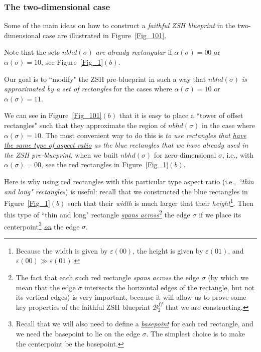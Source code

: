 \documentclass[12pt,letterpaper]{article}
\renewcommand{\S}{\mathcal{S}}
\newcommand{\B}{\mathcal{B}}
\newcommand{\eps}{\varepsilon}
\newcommand{\nbhd}{\mathit{nbhd}}
\begin{document}
\subsubsection{The two-dimensional case}


Some of the main ideas on how  to construct  a {\em faithful ZSH blueprint} in the two-dimensional case are illustrated in Figure~\ref{Fig_101}. 

Note that the sets $\nbhd(\sigma)$ {\em are already rectangular} if $\alpha(\sigma) = 00$ or $\alpha(\sigma) = 10$, see Figure~\ref{Fig_1}$(b)$. 

Our goal is to ``modify" the ZSH pre-blueprint in such a way that $\nbhd(\sigma)$ {\em is approximated by a set of rectangles} for the cases where $\alpha(\sigma) = 10$ or $\alpha(\sigma) = 11$. 

We can see in Figure~\ref{Fig_101}$(b)$ that it is easy to place a ``tower of offset rectangles" such that they  approximate the region of $\nbhd(\sigma)$ in the case where $\alpha(\sigma) = 10$. The most convenient way to do this is {\em to use rectangles that  \ul{have the same type of aspect ratio} as the blue rectangles that we have already used in the ZSH pre-blueprint}, when we built $\nbhd(\sigma)$ for zero-dimensional $\sigma$, i.e., with $\alpha(\sigma) = 00$, see the red rectangles in Figure~\ref{Fig_1}$(b)$. 


Here is why using red rectangles with this particular type aspect ratio (i.e., {\em ``thin and long" rectangles}) is useful: recall that we constructed the blue rectangles in Figure~\ref{Fig_1}$(b)$
such that their {\em width} is much larger that their {\em height}\footnote{Because the width is given by $\eps(00)$, the height is given by $\eps(01)$, and  $\eps(00) \gg \eps(01)$.}. Then this type of ``thin and long" rectangle \ul{\em spans across}\footnote{The fact that each such red rectangle {\em spans across} the edge $\sigma$ (by which we mean that the edge $\sigma$  intersects the horizontal edges of the rectangle, but not its vertical edges) is very important, because it will allow us to prove some key properties of the faithful ZSH blueprint $\B_2^\mathit{ff}$ that we are constructing. 
} the edge $\sigma$ if we place its  centerpoint\footnote{Recall that we will also need to define a \ul{\em basepoint} for each red rectangle, and we need the basepoint to lie on the edge $\sigma$. The simplest choice is to make the centerpoint be the basepoint.} \ul{\em on} the edge $\sigma$.
\end{document}
